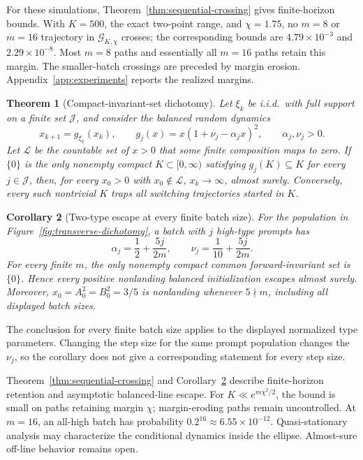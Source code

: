 \documentclass[11pt]{article}
\newtheorem{theorem}{Theorem}
\newtheorem{corollary}[theorem]{Corollary}
\begin{document}
For these simulations, Theorem~\ref{thm:sequential-crossing} gives
finite-horizon bounds.  With \(K=500\), the exact two-point range, and
\(\chi=1.75\), no \(m=8\) or \(m=16\) trajectory in
\(\mathcal G_{K,\chi}\) crosses; the corresponding bounds are
\(4.79\times10^{-3}\) and \(2.29\times10^{-8}\).  Most \(m=8\) paths and
essentially all \(m=16\) paths retain this margin.  The smaller-batch
crossings are preceded by margin erosion.  Appendix~\ref{app:experiments}
reports the realized margins.

\begin{theorem}[Compact-invariant-set dichotomy]
\label{thm:as-escape}
Let \(\xi_k\) be i.i.d.\ with full support on a finite set
\(\mathcal J\), and consider the balanced random dynamics
\[
    x_{k+1}=g_{\xi_k}(x_k),
    \qquad
    g_j(x)=x(1+\nu_j-\alpha_jx)^2,
    \qquad \alpha_j,\nu_j>0.
\]
Let \(\mathcal L\) be the countable set of \(x>0\) that some finite
composition maps to zero.  If \(\{0\}\) is the only nonempty compact
\(K\subset[0,\infty)\) satisfying \(g_j(K)\subseteq K\) for every
\(j\in\mathcal J\), then, for every \(x_0>0\) with
\(x_0\notin\mathcal L\), $ x_k\to\infty$, almost surely. Conversely, every such nontrivial \(K\) traps all switching trajectories
started in \(K\).
\end{theorem}

\begin{corollary}[Two-type escape at every finite batch size]
\label{cor:two-type-as-escape}
For the population in Figure~\ref{fig:transverse-dichotomy}, a batch with
\(j\) high-type prompts has
\[
\alpha_j=\frac12+\frac{5j}{2m},
\qquad
\nu_j=\frac1{10}+\frac{5j}{2m}.
\]
For every finite \(m\), the only nonempty compact common forward-invariant
set is \(\{0\}\).  Hence every positive nonlanding balanced initialization
escapes almost surely.  Moreover, \(x_0=A_0^2=B_0^2=3/5\) is nonlanding whenever
\(5\nmid m\), including all displayed batch sizes.
\end{corollary}

The conclusion for every finite batch size applies to the displayed
normalized type parameters.  Changing the step size for the same prompt
population changes the \(\nu_j\), so the corollary does not give a
corresponding statement for every step size.

Theorem~\ref{thm:sequential-crossing} and
Corollary~\ref{cor:two-type-as-escape} describe finite-horizon retention and
asymptotic balanced-line escape.  For \(K\ll e^{m\chi^2/2}\), the bound is
small on paths retaining margin \(\chi\); margin-eroding paths remain
uncontrolled.  At
\(m=16\), an all-high batch has probability
\(0.2^{16}\approx6.55\times10^{-12}\).  Quasi-stationary analysis may
characterize the conditional dynamics inside the ellipse.  Almost-sure
off-line behavior remains open.
\end{document}
